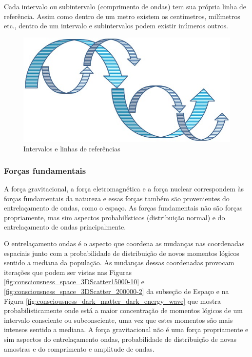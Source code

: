 Cada intervalo ou subintervalo (comprimento de ondas) tem sua própria linha de referência. Assim como dentro de um metro existem os centímetros, milímetros etc., dentro de um intervalo e subintervalos podem existir inúmeros outros.
	\begin{figure}[H]
	\caption{Intervalos e linhas de referências}
	\label{fig:consciousness_space_spiral_underlines}
	\centering
	\includegraphics[scale=.5]{sections/images/consciousness_space_spiral_underlines.jpg}
	\end{figure}

\subsubsection{Forças fundamentais}
A força gravitacional, a força eletromagnética e a força nuclear correspondem às forças fundamentais da natureza e essas forças também são provenientes do entrelaçamento de ondas, como o espaço. As forças fundamentais não são forças propriamente, mas sim aspectos probabilísticos (distribuição normal) e do entrelaçamento de ondas principalmente.

O entrelaçamento ondas é o aspecto que coordena as mudanças nas coordenadas espaciais junto com a probabilidade de distribuição de novos momentos lógicos sentido a mediana da população. As mudanças dessas coordenadas provocam iterações que podem ser vistas nas Figuras \ref{fig:consciousness_space_3DScatter15000-10} e \ref{fig:consciousness_space_3DScatter_200000-2} da subseção de Espaço e na Figura \ref{fig:consciousness_dark_matter_dark_energy_wave} que mostra probabilisticamente onde está a maior concentração de momentos lógicos de um intervalo consciente ou subconsciente, uma vez que estes momentos são mais intensos sentido a mediana. A força gravitacional não é uma força propriamente e sim aspectos do entrelaçamento ondas, probabilidade de distribuição de novas amostras e do comprimento e amplitude de ondas.

